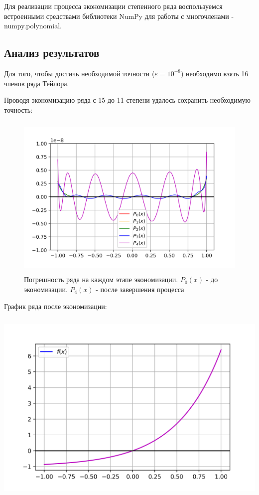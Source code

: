 Для реализации процесса экономизации степенного ряда воспользуемся встроенными средствами библиотеки NumPy для работы с многочленами - numpy.polynomial.

\newpage
\subsection*{Анализ результатов}
Для того, чтобы достичь необходимой точности ($\varepsilon = 10^{-8}$) необходимо взять 16 членов ряда Тейлора.

Проводя экономизацию ряда с 15 до 11 степени удалось сохранить необходимую точность:
\begin{figure}[h!]
	\centering                                                                                            
	\includegraphics[height=8cm]{images/plot_4.3_err.png}
	\caption{Погрешность ряда на каждом этапе экономизации. $P_0(x)$ - до экономизации. $P_4(x)$  - после завершения процесса}
\end{figure}

График ряда после экономизации:

\includegraphics[height=9.5cm]{images/plot_4.3_func.png}

